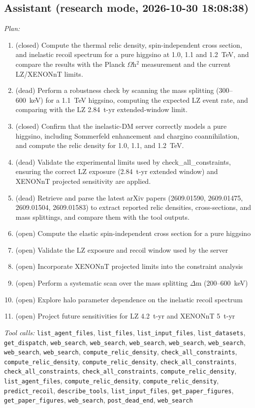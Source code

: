 \documentclass[11pt,a4paper]{article}
\begin{document}
\subsection*{Assistant \small(research mode, 2026-10-30 18:08:38)}
\textit{Plan:}\begin{enumerate}
  \item (closed) Compute the thermal relic density, spin-independent cross section, and inelastic recoil spectrum for a pure higgsino at 1.0, 1.1 and 1.2~TeV, and compare the results with the Planck $\Omega$h$^2$ measurement and the current LZ/XENONnT limits.
  \item (dead) Perform a robustness check by scanning the mass splitting (300--600~keV) for a 1.1~TeV higgsino, computing the expected LZ event rate, and comparing with the LZ 2.84~t-yr extended-window limit.
  \item (closed) Confirm that the inelastic-DM server correctly models a pure higgsino, including Sommerfeld enhancement and chargino coannihilation, and compute the relic density for 1.0, 1.1, and 1.2~TeV.
  \item (dead) Validate the experimental limits used by check\_all\_constraints, ensuring the correct LZ exposure (2.84~t-yr extended window) and XENONnT projected sensitivity are applied.
  \item (dead) Retrieve and parse the latest arXiv papers (2609.01590, 2609.01475, 2609.01504, 2609.01583) to extract reported relic densities, cross-sections, and mass splittings, and compare them with the tool outputs.
  \item (open) Compute the elastic spin-independent cross section for a pure higgsino
  \item (open) Validate the LZ exposure and recoil window used by the server
  \item (open) Incorporate XENONnT projected limits into the constraint analysis
  \item (open) Perform a systematic scan over the mass splitting $\Delta$m (200--600~keV)
  \item (open) Explore halo parameter dependence on the inelastic recoil spectrum
  \item (open) Project future sensitivities for LZ 4.2~t-yr and XENONnT 5~t-yr
\end{enumerate}
\textit{Tool calls:} \texttt{list\_agent\_files}, \texttt{list\_files}, \texttt{list\_input\_files}, \texttt{list\_datasets}, \texttt{get\_dispatch}, \texttt{web\_search}, \texttt{web\_search}, \texttt{web\_search}, \texttt{web\_search}, \texttt{web\_search}, \texttt{web\_search}, \texttt{web\_search}, \texttt{compute\_relic\_density}, \texttt{check\_all\_constraints}, \texttt{compute\_relic\_density}, \texttt{compute\_relic\_density}, \texttt{check\_all\_constraints}, \texttt{check\_all\_constraints}, \texttt{check\_all\_constraints}, \texttt{compute\_relic\_density}, \texttt{list\_agent\_files}, \texttt{compute\_relic\_density}, \texttt{compute\_relic\_density}, \texttt{predict\_recoil}, \texttt{describe\_tools}, \texttt{list\_input\_files}, \texttt{get\_paper\_figures}, \texttt{get\_paper\_figures}, \texttt{web\_search}, \texttt{post\_dead\_end}, \texttt{web\_search}\par
\end{document}

